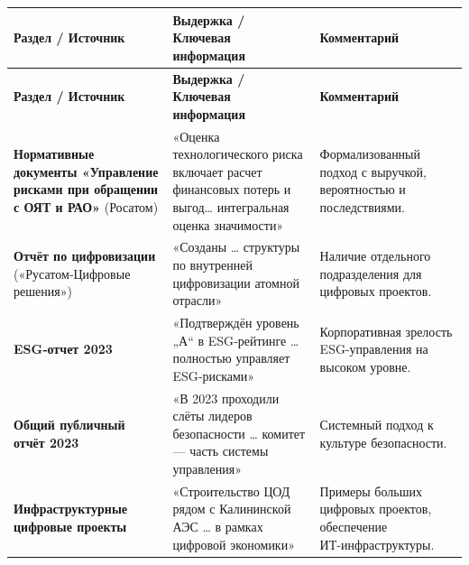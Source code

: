 \documentclass[12pt]{article}
\begin{document}
\begin{longtable}{|p{4.5cm}|p{6cm}|p{4.5cm}|}
\hline
\textbf{Раздел / Источник} & \textbf{Выдержка / Ключевая информация} & \textbf{Комментарий} \\
\hline
\endfirsthead
\hline
\textbf{Раздел / Источник} & \textbf{Выдержка / Ключевая информация} & \textbf{Комментарий} \\
\hline
\endhead

\textbf{Нормативные документы «Управление рисками при обращении с ОЯТ и РАО»} (Росатом) & 
«Оценка технологического риска включает расчет финансовых потерь и выгод… интегральная оценка значимости» & 
Формализованный подход с выручкой, вероятностью и последствиями. \\
\hline

\textbf{Отчёт по цифровизации} («Русатом‑Цифровые решения») & 
«Созданы … структуры по внутренней цифровизации атомной отрасли» & 
Наличие отдельного подразделения для цифровых проектов. \\
\hline

\textbf{ESG‑отчет 2023} & 
«Подтверждён уровень „А“ в ESG‑рейтинге … полностью управляет ESG‑рисками» & 
Корпоративная зрелость ESG-управления на высоком уровне. \\
\hline

\textbf{Общий публичный отчёт 2023} & 
«В 2023 проходили слёты лидеров безопасности … комитет — часть системы управления» & 
Системный подход к культуре безопасности. \\
\hline

\textbf{Инфраструктурные цифровые проекты} & 
«Строительство ЦОД рядом с Калининской АЭС … в рамках цифровой экономики» & 
Примеры больших цифровых проектов, обеспечение ИТ‑инфраструктуры. \\
\hline

\end{longtable}

\end{document}
